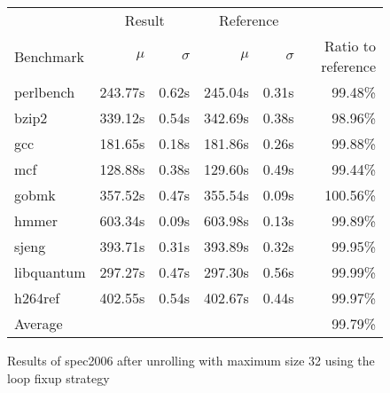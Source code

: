 \begin{figure}[h]
    \begin{center}
        \begin{tabular}{lrrrrr}
            \toprule
            & \multicolumn{2}{c}{Result} & \multicolumn{2}{c}{Reference}\\
            Benchmark & $\mu$ & $\sigma$ & $\mu$ & $\sigma$ & Ratio to reference\\
            \midrule
            perlbench & 243.77s & 0.62s & 245.04s & 0.31s & 99.48\%\\
            bzip2 & 339.12s & 0.54s & 342.69s & 0.38s & 98.96\%\\
            gcc & 181.65s & 0.18s & 181.86s & 0.26s & 99.88\%\\
            mcf & 128.88s & 0.38s & 129.60s & 0.49s & 99.44\%\\
            gobmk & 357.52s & 0.47s & 355.54s & 0.09s & 100.56\%\\
            hmmer & 603.34s & 0.09s & 603.98s & 0.13s & 99.89\%\\
            sjeng & 393.71s & 0.31s & 393.89s & 0.32s & 99.95\%\\
            libquantum & 297.27s & 0.47s & 297.30s & 0.56s & 99.99\%\\
            h264ref & 402.55s & 0.54s & 402.67s & 0.44s & 99.97\%\\
            \midrule
            Average & & & & & 99.79\%\\
            \bottomrule
        \end{tabular}
    \end{center}
    \caption{Results of spec2006 after unrolling with maximum size 32 using the loop fixup strategy}
    \label{fig:eval:perf:loop:32}
\end{figure}
